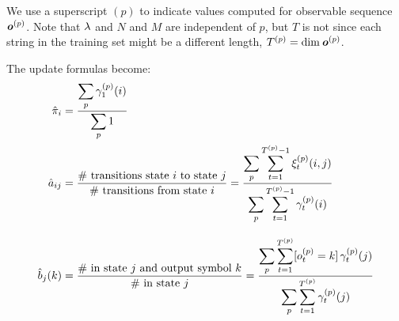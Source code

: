 We use a superscript $(p)$ to indicate values computed for observable
sequence $\boldsymbol{\mathit{o}}^{(p)}$.  Note that $\lambda$ and $N$ and $M$ are
independent of $p$, but $T$ is not since each string in the training
set might be a different length, $T^{(p)} = \dim \boldsymbol{\mathit{o}}^{(p)}$.

The update formulas become:
\begin{align*}
  \hat{\pi}_i &= \frac{\displaystyle\sum_p \gamma^{(p)}_1(i)}{\displaystyle\sum_p 1}
  \\
  \hat{a}_{ij} &= \frac{\text{\# transitions state $i$ to state $j$}}
		       {\text{\# transitions from state $i$}}
  = \frac{\displaystyle\sum_p \displaystyle\sum_{t=1}^{T^{(p)}-1}  \xi^{(p)}_t(i,j)}
	 {\displaystyle\sum_p \displaystyle\sum_{t=1}^{T^{(p)}-1} \gamma^{(p)}_t(i)}
  \\[2ex]
  \hat{b}_j(k)
  &= \frac{\text{\# in state $j$ and output symbol $k$}}
	  {\text{\# in state $j$}}
  = \frac{\displaystyle\sum_p \displaystyle\sum_{t=1}^{T^{(p)}} [o^{(p)}_t=k] \, \gamma^{(p)}_t(j)}
	 {\displaystyle\sum_p \displaystyle\sum_{t=1}^{T^{(p)}} \gamma^{(p)}_t(j)}
\end{align*}

